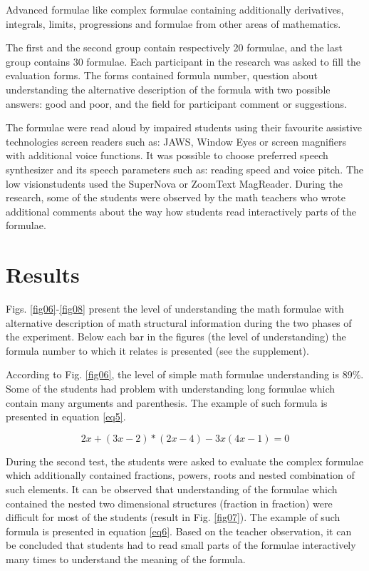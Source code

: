 \documentclass[12pt,1p]{elsarticle}
\begin{document}
	Advanced formulae like complex formulae containing additionally derivatives, integrals, limits, progressions and formulae from other areas of mathematics.
	
	The first and the second group contain respectively 20 formulae, and the last group contains 30 formulae. Each participant in the research was asked to fill the evaluation forms. The forms contained formula number, question about understanding the alternative description of the formula with two possible answers: good and poor, and the field for participant comment or suggestions.
	
	The formulae were read aloud by impaired students using their favourite assistive technologies screen readers such as: JAWS, Window Eyes or screen magnifiers with additional voice functions. It was possible to choose preferred speech synthesizer and its speech parameters such as: reading speed and voice pitch. The low visionstudents used the SuperNova or ZoomText MagReader. During the research, some of the students were observed by the math teachers who wrote additional comments about the way how students read interactively parts of the formulae.
\section{Results}
	
	Figs. \ref{fig06}-\ref{fig08} present the level of understanding the math formulae with alternative description of math structural information during the two phases of the experiment. Below each bar in the figures (the level of understanding) the formula number to which it relates is presented (see the supplement).
	
	According to Fig. \ref{fig06}, the level of simple math formulae understanding is 89\%. Some of the students had problem with understanding long formulae which contain many arguments and parenthesis. The example of such formula is presented in equation \ref{eq5}.

\begin{equation}
\label{eq5}
2x + (3x - 2) * (2x - 4) - 3x(4x - 1) = 0
\end{equation}

	During the second test, the students were asked to evaluate the complex formulae which additionally contained fractions, powers, roots and nested combination of such elements. It can be observed that understanding of the formulae which contained the nested two dimensional structures (fraction in fraction) were difficult for most of the students (result in Fig. \ref{fig07}). The example of such formula is presented in equation \ref{eq6}. Based on the teacher observation, it can be concluded that students had to read small parts of the formulae interactively many times to understand the meaning of the formula.
\end{document}
